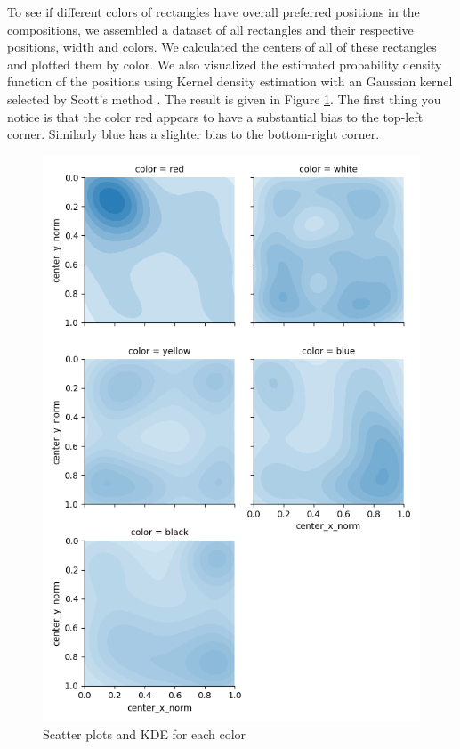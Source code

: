 \documentclass[serif,article,noparskip]{agse-thesis}
\begin{document}
To see if different colors of rectangles have overall preferred positions in the
compositions, we assembled a dataset of all rectangles and their respective
positions, width and colors. We calculated the centers of all of these
rectangles and plotted them by color. We also visualized the estimated
probability density function of the positions using Kernel density estimation
with an Gaussian kernel selected by Scott's method \cite{Terrell1992}. The
result is given in Figure \ref{fig:kde}. The first thing you notice is that the
color red appears to have a substantial bias to the top-left corner. Similarly
blue has a slighter bias to the bottom-right corner.

\begin{figure}
\includegraphics[width=\linewidth]{images/kernel-densities.png}
\caption{Scatter plots and KDE for each color}
\label{fig:kde}
\end{figure}
\end{document}
